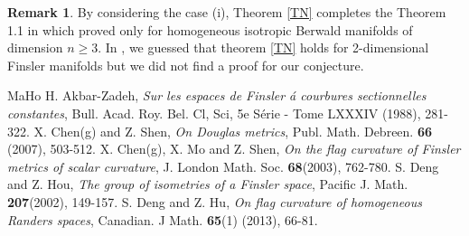 \documentclass[12pt,a4paper]{article}
\theoremstyle{definition}
\newtheorem{rem}{Remark}[section]
\numberwithin{equation}{section}
\begin{document}
\bigskip
\begin{rem}
By considering the case (i), Theorem \ref{TN} completes  the Theorem 1.1 in \cite{TN2} which proved only for homogeneous  isotropic Berwald manifolds of dimension $n\geq 3$. In \cite{TN2}, we guessed that theorem \ref{TN} holds for 2-dimensional Finsler manifolds but we  did not find a proof for our conjecture.
\end{rem}


\begin{thebibliography}{MaHo}
  H. Akbar-Zadeh, {\it Sur les espaces de Finsler \'{a} courbures sectionnelles constantes}, Bull. Acad. Roy. Bel. Cl, Sci, 5e S\'{e}rie
 - Tome LXXXIV (1988), 281-322.
 X. Chen(g) and Z. Shen, {\it On Douglas metrics}, Publ. Math. Debreen. {\bf 66} (2007), 503-512.
 X. Chen(g), X. Mo and Z. Shen, {\it On the flag curvature of Finsler metrics of scalar curvature}, J. London Math. Soc. {\bf 68}(2003), 762-780.
  S. Deng and Z. Hou,  {\it The group of isometries of a Finsler space}, Pacific J. Math. {\bf 207}(2002), 149-157.
   S. Deng and Z. Hu,  {\it  On flag curvature of homogeneous Randers spaces}, Canadian. J Math. {\bf 65}(1) (2013), 66-81.

\end{thebibliography}
\end{document}
